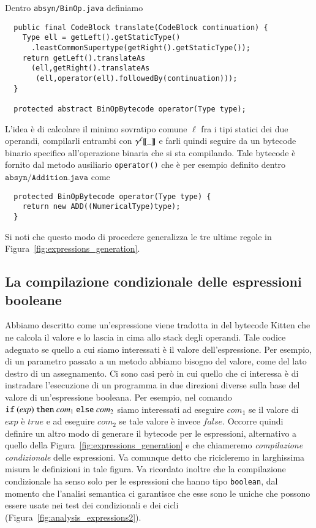 Dentro \texttt{absyn/BinOp.java} definiamo
%
\begin{verbatim}
  public final CodeBlock translate(CodeBlock continuation) {
    Type ell = getLeft().getStaticType()
      .leastCommonSupertype(getRight().getStaticType());
    return getLeft().translateAs
      (ell,getRight().translateAs
       (ell,operator(ell).followedBy(continuation)));
  }

  protected abstract BinOpBytecode operator(Type type);
\end{verbatim}
%
L'idea \`e di calcolare il minimo sovratipo comune $\ell$
fra i tipi statici dei due operandi, compilarli entrambi con
${\gamma^{{\mathit{\ell}}}[\![{\_}]\!]}$ e farli quindi seguire da un bytecode binario
specifico all'operazione binaria che si sta compilando. Tale bytecode
\`e fornito dal metodo ausiliario \texttt{operator()} che \`e per esempio
definito dentro $\mathtt{absyn/Addition.java}$ come
%
\begin{verbatim}
  protected BinOpBytecode operator(Type type) {
    return new ADD((NumericalType)type);
  }
\end{verbatim}
%
Si noti che questo modo di procedere generalizza le tre ultime regole
in Figura~\ref{fig:expressions_generation}.
%
\subsection{La compilazione condizionale delle espressioni booleane}
  \label{subsec:conditional_generation}
%
Abbiamo descritto come un'espressione viene tradotta in del bytecode
Kitten che ne calcola il valore e lo lascia in cima allo stack degli
operandi. Tale codice \e adeguato se quello a cui
siamo interessati \`e il valore dell'espressione. Per esempio, di un parametro
passato a un metodo abbiamo bisogno del valore, \cosi come del lato destro
di un assegnamento.
Ci sono casi per\`o in cui quello che ci interessa \`e di instradare
l'esecuzione di un programma in due direzioni diverse sulla base
del valore di un'espressione booleana. Per esempio, nel comando
$\mathtt{if\ (\mathit{exp})\ then\ \mathit{com}_{\rm 1}
\ else\ \mathit{com}_{\rm 2}}$
siamo interessati ad eseguire $\mathit{com}_1$ se il valore
di $\mathit{exp}$ \`e $\mathit{true}$ e ad eseguire $\mathit{com}_2$
se tale valore \`e invece $\mathit{false}$. Occorre quindi definire
un altro modo di generare il bytecode per le espressioni,
alternativo a quello della
Figura~\ref{fig:expressions_generation} e che chiameremo
\emph{compilazione condizionale} delle espressioni. Va comunque detto che
ricicleremo in larghissima misura le definizioni in tale figura. Va ricordato
inoltre che
la compilazione condizionale ha senso solo per le espressioni che hanno
tipo \texttt{boolean},
dal momento che l'analisi semantica ci garantisce che esse sono le uniche
che possono essere usate nei test dei condizionali e dei cicli
(Figura~\ref{fig:analysis_expressions2}).

